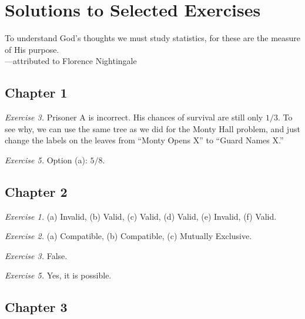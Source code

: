 \documentclass[justified]{tufte-book}
\newenvironment{epigraph}%
{
\begin{flushright}    
\begin{minipage}{20em}
\begin{flushright}
\itshape
}%
{
\end{flushright}
\end{minipage}
\end{flushright}
}
\begin{document}
\hypertarget{solutions-to-selected-exercises}{%
\chapter{Solutions to Selected Exercises}\label{solutions-to-selected-exercises}}

\begin{epigraph}
To understand God's thoughts we must study statistics, for these are the
measure of His purpose.\\
---attributed to Florence Nightingale
\end{epigraph}

\hypertarget{chapter-1}{%
\section*{Chapter 1}\label{chapter-1}}

\noindent
\emph{Exercise 3.} Prisoner A is incorrect. His chances of survival are still only \(1/3\). To see why, we can use the same tree as we did for the Monty Hall problem, and just change the labels on the leaves from ``Monty Opens X'' to ``Guard Names X.''

\vspace{.5em}\vspace{.5em}

\noindent
\emph{Exercise 5.} Option (a): \(5/8\).

\hypertarget{chapter-2}{%
\section*{Chapter 2}\label{chapter-2}}

\noindent
\emph{Exercise 1.} (a) Invalid, (b) Valid, (c) Valid, (d) Valid, (e) Invalid, (f) Valid.

\vspace{.5em}

\noindent
\emph{Exercise 2.} (a) Compatible, (b) Compatible, (c) Mutually Exclusive.

\vspace{.5em}

\noindent
\emph{Exercise 3.} False.

\vspace{.5em}

\noindent
\emph{Exercise 5.} Yes, it is possible.

\hypertarget{chapter-3}{%
\section*{Chapter 3}\label{chapter-3}}
\end{document}
